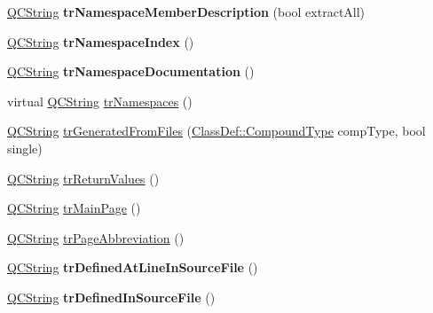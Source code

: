 \begin{DoxyCompactItemize}
\mbox{\label{class_translator_slovene_a9e3d245e1e2b5760bb4fa88990a11eb5}} 
\mbox{\hyperlink{class_q_c_string}{Q\+C\+String}} {\bfseries tr\+Namespace\+Member\+Description} (bool extract\+All)
\item 
\mbox{\label{class_translator_slovene_a38fe4e3c9ac5c14586e93dd6f7918686}} 
\mbox{\hyperlink{class_q_c_string}{Q\+C\+String}} {\bfseries tr\+Namespace\+Index} ()
\item 
\mbox{\label{class_translator_slovene_aac9ca444ecdf4cbf93b2924620c70a39}} 
\mbox{\hyperlink{class_q_c_string}{Q\+C\+String}} {\bfseries tr\+Namespace\+Documentation} ()
\item 
virtual \mbox{\hyperlink{class_q_c_string}{Q\+C\+String}} \mbox{\hyperlink{class_translator_slovene_add5425ba38e8d628a8548a5cd93ef0c9}{tr\+Namespaces}} ()
\item 
\mbox{\hyperlink{class_q_c_string}{Q\+C\+String}} \mbox{\hyperlink{class_translator_slovene_a37891d699740842b4583a8a185140cbc}{tr\+Generated\+From\+Files}} (\mbox{\hyperlink{class_class_def_ae70cf86d35fe954a94c566fbcfc87939}{Class\+Def\+::\+Compound\+Type}} comp\+Type, bool single)
\item 
\mbox{\hyperlink{class_q_c_string}{Q\+C\+String}} \mbox{\hyperlink{class_translator_slovene_a23840e57d61b02871f444926553c4a6f}{tr\+Return\+Values}} ()
\item 
\mbox{\hyperlink{class_q_c_string}{Q\+C\+String}} \mbox{\hyperlink{class_translator_slovene_aab9af959a4ec7611e76d4d725a8eb748}{tr\+Main\+Page}} ()
\item 
\mbox{\hyperlink{class_q_c_string}{Q\+C\+String}} \mbox{\hyperlink{class_translator_slovene_a80c864485225b2018f3c518f3f95c1f1}{tr\+Page\+Abbreviation}} ()
\item 
\mbox{\label{class_translator_slovene_a11a17759b13a7b0ace5b57c7ef8126eb}} 
\mbox{\hyperlink{class_q_c_string}{Q\+C\+String}} {\bfseries tr\+Defined\+At\+Line\+In\+Source\+File} ()
\item 
\mbox{\label{class_translator_slovene_a12574e71eac363da755aa415c53a524e}} 
\mbox{\hyperlink{class_q_c_string}{Q\+C\+String}} {\bfseries tr\+Defined\+In\+Source\+File} ()
\item 
\mbox{\label{class_translator_slovene_aac1ea34816ffccd4558d12270565b73e}} 

\end{DoxyCompactItemize}
